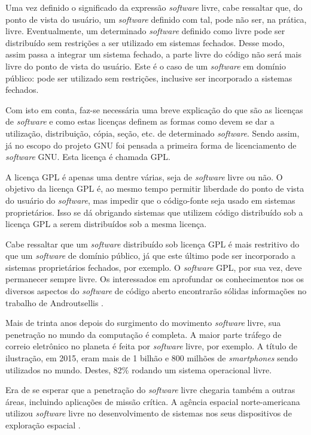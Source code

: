 Uma vez definido o significado da expressão \textit{software} livre, cabe ressaltar que, do ponto de
vista do usuário, um \textit{software} definido com tal, pode não ser, na prática, livre.
Eventualmente, um determinado \textit{software} definido como livre pode ser distribuído sem
restrições a ser utilizado em sistemas
fechados. Desse modo, assim passa a integrar um sistema fechado, a parte livre do código não será mais livre do ponto de vista do usuário. Este é o caso de um \textit{software} em domínio público: pode ser utilizado sem restrições, inclusive ser incorporado a sistemas fechados.

Com isto em conta, faz-se necessária uma breve explicação do que são as licenças
de \textit{software} e como estas licenças definem as formas como devem se dar a utilização, distribuição, cópia, seção, etc. de determinado \textit{software}. Sendo assim,
já no escopo do projeto GNU \cite{Stallman1985} foi pensada a primeira forma
de licenciamento de \textit{software}
GNU. Esta licença é chamada GPL.

A licença GPL é apenas uma dentre várias, seja de \textit{software} livre ou
não. O objetivo da licença GPL é, ao mesmo tempo permitir liberdade do ponto de vista
do usuário do \textit{software}, mas impedir que o código-fonte seja usado em sistemas proprietários. Isso se dá obrigando sistemas que utilizem código
distribuído sob a licença GPL a serem distribuídos sob a mesma licença.

Cabe ressaltar que um \textit{software} distribuído sob licença GPL é mais restritivo do
que um \textit{software} de domínio público, já que este último pode ser incorporado
a sistemas proprietários fechados, por exemplo. O \textit{software} GPL, por sua vez,
deve permanecer sempre livre. Os interessados em aprofundar os conhecimentos nos
os diversos aspectos do \textit{software} de código aberto encontrarão sólidas informações
no trabalho de Androutsellis \cite{Androutsellis2010}.

Mais de trinta anos depois do surgimento do movimento \textit{software} livre,
sua penetração no mundo da computação é completa. A maior parte tráfego de correio
eletrônico no planeta é feita por \textit{software} livre, por exemplo.  A título
de ilustração, em 2015, eram mais de 1 bilhão e 800 milhões de \textit{smartphones}
sendo utilizados no mundo. Destes, 82\% rodando um sistema operacional livre.

Era de se esperar que a penetração do \textit{software} livre chegaria também a outras
áreas, incluindo aplicações de missão crítica. A agência espacial norte-americana
utilizou \textit{software} livre no desenvolvimento de sistemas nos seus dispositivos
de exploração espacial \cite{Norris2004}.

